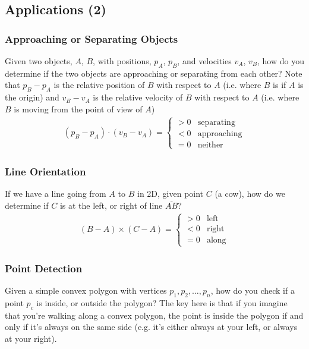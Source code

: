 \documentclass[12pt]{report}
\begin{document}
\subsection{Applications (2)}
\subsubsection{Approaching or Separating Objects}
Given two objects, $A$, $B$, with positions, $p_A$, $p_B$, and velocities $v_A$, $v_B$, how do you determine if the two objects are approaching or separating from each other?
Note that $p_B - p_A$ is the relative position of $B$ with respect to $A$ (i.e. where $B$ is if $A$ is the origin) and $v_B - v_A$ is the relative velocity of $B$ with respect to $A$ (i.e. where $B$ is moving from the point of view of $A$)
\begin{align}
	(p_B - p_A) \cdot (v_B - v_A) = 
	\begin{cases}
	> 0 & \text{separating}  \\
	< 0 & \text{approaching} \\
	= 0 & \text{neither}     
	\end{cases}
\end{align}
		
\subsubsection{Line Orientation}
		
If we have a line going from $A$ to $B$ in 2D, given point $C$ (a cow), how do we determine if $C$ is at the left, or right of line $\overline{AB}$?
\begin{align}
	(B - A) \times (C - A) = \begin{cases}
	> 0 & \text{left}  \\
	< 0 & \text{right} \\
	= 0 & \text{along} 
	\end{cases}
\end{align}
\subsubsection{Point Detection}
Given a simple convex polygon with vertices $p_1, p_2, \dots, p_n$, how do you check if a point $p_c$ is inside, or outside the polygon? The key here is that if you imagine that you're walking along a convex polygon, the point is inside the polygon if and only if it's always on the same side (e.g. it's either always at your left, or always at your right).
		
\end{document}
